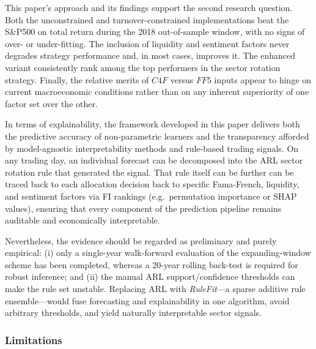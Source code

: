 
This paper's approach and its findings support the second research question. Both the unconstrained and turnover-constrained implementations beat the S\&P500 on total return during the 2018 out-of-sample window, with no signs of over- or under-fitting. The inclusion of liquidity and sentiment factors never degrades strategy performance and, in most cases, improves it. The enhanced variant consistently rank among the top performers in the sector rotation strategy. Finally, the relative merits of $C4F$ versus $FF5$ inputs appear to hinge on current macroeconomic conditions rather than on any inherent superiority of one factor set over the other.

In terms of explainability, the framework developed in this paper delivers both the predictive accuracy of non-parametric learners and the transparency afforded by model-agnostic interpretability methods and rule-based trading signals. On any trading day, an individual forecast can be decomposed into the ARL sector rotation rule that generated the signal. That rule itself can be further can be traced back to each allocation decision back to specific Fama-French, liquidity, and sentiment factors via FI rankings (e.g.\ permutation importance or SHAP values), ensuring that every component of the prediction pipeline remains auditable and economically interpretable.

Nevertheless, the evidence should be regarded as preliminary and purely empirical: (i) only a single-year walk-forward evaluation of the expanding-window scheme has been completed, whereas a 20-year rolling back-test is required for robust inference; and (ii) the manual ARL support/confidence thresholds can make the rule set unstable. Replacing ARL with \emph{RuleFit}—a sparse additive rule ensemble—would fuse forecasting and explainability in one algorithm, avoid arbitrary thresholds, and yield naturally interpretable sector signals.

\subsubsection{Limitations}

